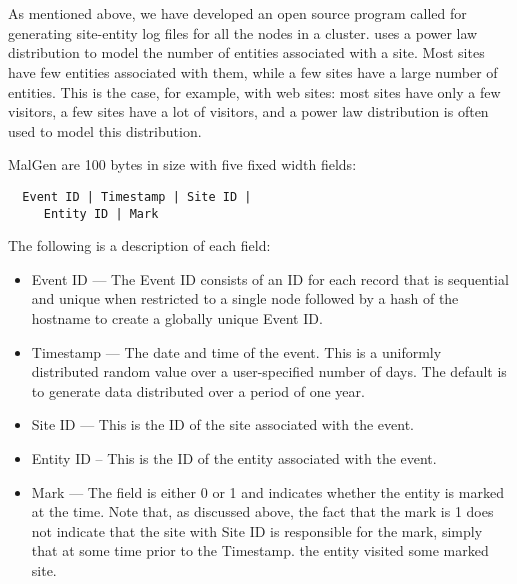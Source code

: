 \documentclass{acm_proc_article-sp}
\begin{document}
\vfill
\section{\malgen }
\label{section:malgen}
As mentioned above, we have developed an open source program called
\malgen for generating site-entity log files for all the nodes in a
cluster.  \malgen uses a power law distribution to model the number of
entities associated with a site.  Most sites have few entities
associated with them, while a few sites have a large number of
entities.  This is the case, for example, with web sites: most sites
have only a few visitors, a few sites have a lot of visitors, and a
power law distribution is often used to model this distribution.

MalGen are 100 bytes in size with five fixed width fields:
\begin{verbatim}
  Event ID | Timestamp | Site ID | 
     Entity ID | Mark 
\end{verbatim}
The following is a description of each field:

\begin{itemize}
\item Event ID ---  The Event ID consists of an ID for each record that is sequential and unique when restricted to a single node followed by a hash of the hostname to create a globally unique Event  ID.

\item Timestamp --- The date and time of the event. This is a
  uniformly distributed random value over a user-specified number of
  days.  The default is to generate data distributed over a period of
  one year.

\item Site ID --- This is the ID of the site associated with the event. 

\item Entity ID -- This is the ID of the entity associated with the  event.

\item Mark --- The field is either 0 or 1 and indicates whether
the entity is marked at the time.  Note that, as discussed above, the fact that the mark is 1 does 
not indicate that the site with Site ID is responsible for the mark, simply that at some time
prior to the Timestamp. the entity visited some marked site.

\end{itemize}
\end{document}

